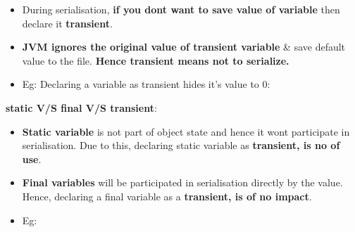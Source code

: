 \setlength{\columnsep}{3pt}
\begin{flushleft}
	\begin{itemize}
		\item During serialisation, \textbf{if you dont want to save value of variable} then declare it \textbf{transient}.
		\item \textbf{JVM ignores the original value of transient variable} \& save default value to the file. \textbf{Hence transient means not to serialize.}
		\item Eg: Declaring a variable as transient hides it's value to 0:
	\end{itemize}
	\newpage
	\textbf{static V/S final V/S transient}:
	\begin{itemize}
		\item \textbf{Static variable} is not part of object state and hence it wont participate in serialisation. Due to this, declaring static variable as \textbf{transient, is no of use}.
		\item \textbf{Final variables} will be participated in serialisation directly by the value. Hence, declaring a final variable as a \textbf{transient, is of no impact}.
		\item Eg:
	\end{itemize}


\end{flushleft}
